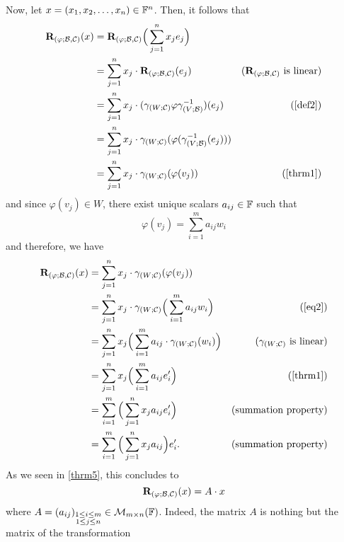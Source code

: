 Now, let $x = (x_{1}, x_{2}, \dots, x_{n}) \in \mathbb{F}^{n}$. Then, it follows that
%
\begin{align*}
    \rep{\varphi}(x) &= \rep{\varphi}\Big(\sum_{j=1}^{n} x_{j} e_{j} \Big) \\
                     &= \sum_{j=1}^{n} x_{j} \cdot \rep{\varphi}(e_{j})                                          &\text{($\rep{\varphi}$ is linear)} \\
                     &= \sum_{j=1}^{n} x_{j} \cdot (\compthr{\comap{W}{\C}}{\varphi}{\comap{V}{\B}^{-1}})(e_{j}) &\text{(\cref{def2})} \\
                     &= \sum_{j=1}^{n} x_{j} \cdot \comap{W}{\C}(\varphi(\comap{V}{\B}^{-1}(e_{j}))) \\
                     &= \sum_{j=1}^{n} x_{j} \cdot \comap{W}{\C}(\varphi(v_{j}))                                 &\text{(\cref{thrm1})}
\end{align*}
%
and since $\varphi(v_{j}) \in W$, there exist unique scalars $a_{ij} \in \mathbb{F}$
such that
%
\begin{equation} \label{eq2}
    \varphi(v_{j}) = \sum_{i=1}^{m} a_{ij} w_{i}
\end{equation}
%
and therefore, we have
%
\begin{align*}
    \rep{\varphi}(x) &= \sum_{j=1}^{n} x_{j} \cdot \comap{W}{\C}(\varphi(v_{j})) \\
                     &= \sum_{j=1}^{n} x_{j} \cdot \comap{W}{\C}\Big(\sum_{i=1}^{m} a_{ij} w_{i}\Big)  &\text{(\cref{eq2})} \\
                     &= \sum_{j=1}^{n} x_{j} \Big(\sum_{i=1}^{m}a_{ij} \cdot \comap{W}{\C}(w_{i})\Big) &\text{($\comap{W}{\C}$ is linear)} \\
                     &= \sum_{j=1}^{n} x_{j} \Big(\sum_{i=1}^{m} a_{ij} e_{i}^{\prime}\Big)            &\text{(\cref{thrm1})} \\
                     &= \sum_{i=1}^{m} \Big(\sum_{j=1}^{n} x_{j} a_{ij} e_{i}^{\prime}\Big)            &\text{(summation property)} \\
                     &= \sum_{i=1}^{m} \Big(\sum_{j=1}^{n} x_{j} a_{ij}\Big) e_{i}^{\prime}.           &\text{(summation property)}          
\end{align*}
%
As we seen in \cref{thrm5}, this concludes to
%
\[
    \mathbf{R}_{(\varphi; \mathcal{B}, \mathcal{C})}(x) = A \cdot x    
\]
%
where $A = (a_{ij})_{\substack{1 \leq i \leq m \\ 1 \leq j \leq n}} \in \mathcal{M}_{m \times n}(\mathbb{F})$.
Indeed, the matrix $A$ is nothing but the matrix of the transformation
